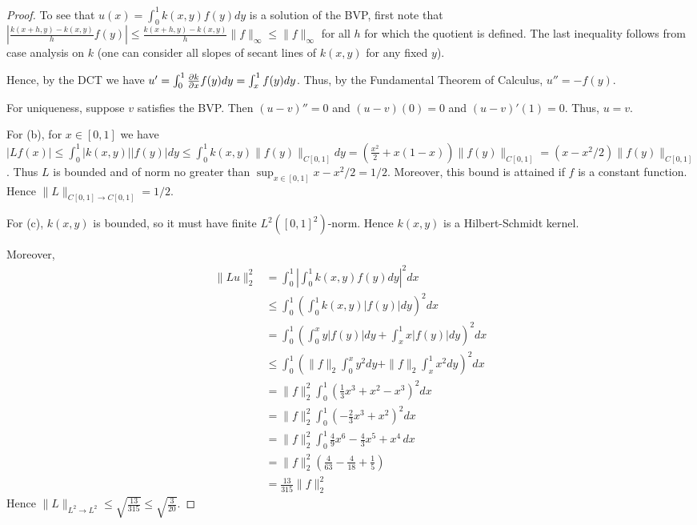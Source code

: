 \documentclass{article}
\begin{document}
\begin{proof}
To see that $u(x) = \int_0^1 k(x,y) f(y) dy$ is a solution of the BVP, first note that 
$\left| \frac{k(x+h,y) - k(x,y)}{h} f(y) \right| \le \frac{k(x+h,y) - k(x,y)}{h} \|f\|_\infty \le \|f\|_\infty$ for all $h$ for which the quotient is defined. The last inequality follows from case analysis on $k$ (one can consider all slopes of secant lines of $k(x,y)$ for any fixed $y$).

Hence, by the DCT we have
$u' = \int_0^1 \pder[k]{x} f(y) dy = \int_x^1 f(y) dy$.
Thus, by the Fundamental Theorem of Calculus, $u'' = - f(y)$.

For uniqueness, suppose $v$ satisfies the BVP. Then $(u-v)'' = 0$ and $(u-v)(0) = 0$ and $(u-v)'(1) = 0$.  Thus, $u = v$.

For (b), for $x \in [0,1]$ we have $|Lf(x)| \le \int_0^1 |k(x,y)| |f(y)| dy \le  \int_0^1 k(x,y) \|f(y)\|_{C[0,1]} dy = \left( \frac {x^2} 2 + x(1 - x) \right) \|f(y)\|_{C[0,1]} = (x - x^2/2)  \|f(y)\|_{C[0,1]}$. Thus $L$ is bounded and of norm no greater than $\sup_{x \in [0,1]} x - x^2/2 = 1/2$.  Moreover, this bound is attained if $f$ is a constant function. Hence $\|L\|_{C[0,1] \to C[0,1]} = 1/2$.

For (c), $k(x,y)$ is bounded, so it must have finite $L^2([0,1]^2)$-norm. Hence $k(x,y)$ is a Hilbert-Schmidt kernel. 

Moreover, 
\begin{align*}
\|Lu\|_2^2 & = \int_0^1 \left|\int_0^1 k(x,y) f(y) dy \right|^2 dx
\\ & \le \int_0^1 \left(  \int_0^1 k(x,y) |f(y)| dy \right)^2 dx
\\ & = \int_0^1 \left( \int_0^x y |f(y)| dy + \int_x^1 x |f(y)| dy \right)^2 dx
\\ & \le \int_0^1 \left( \|f\|_2 \int_0^x y^2 dy  + \|f\|_2 \int_x^1 x^2 dy \right)^2 dx
\\ & = \|f\|_2^2 \int_0^1 \left( \frac 1 3 x^3  + x^2 - x^3  \right)^2 dx
\\ & = \|f\|_2^2 \int_0^1 \left( - \frac 2 3 x^3 + x^2  \right)^2 dx
\\ & = \|f\|_2^2 \int_0^1  \frac 4 9 x^6  -\frac 4 3 x^5 + x^4  \, dx
\\ & = \|f\|_2^2 \left( \frac 4 {63}  -\frac 4 {18}  + \frac 1 5 \right)
\\ & =  \frac {13} {315} \|f\|_2^2 
\end{align*}
Hence $\|L\|_{L^2 \to L^2} \le \sqrt{\frac {13} {315}} \le \sqrt{ \frac 3 {20}}$.
\end{proof}
\end{document}
